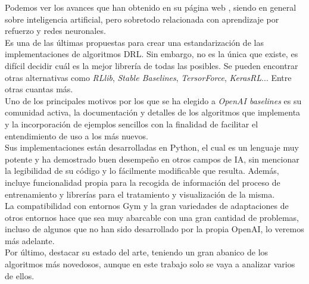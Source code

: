 \documentclass[11pt,fleqn]{book} %
\begin{document}
Podemos ver los avances que han obtenido en su página web \cite{article:openAI2}, siendo en general sobre inteligencia artificial, pero sobretodo relacionada con aprendizaje por refuerzo y redes neuronales.\\

Es una de las últimas propuestas para crear una estandarización de las implementaciones de algoritmos DRL. Sin embargo, no es la única que existe, es difícil decidir cuál es la mejor librería de todas las posibles. Se pueden encontrar otras alternativas como \textit{RLlib}, \textit{Stable Baselines}, \textit{TersorForce}, \textit{KerasRL}... Entre otras cuantas más. \\

Uno de los principales motivos por los que se ha elegido a \textit{OpenAI baselines} es su comunidad activa, la documentación y detalles de los algoritmos que implementa y la incorporación de ejemplos sencillos con la finalidad de facilitar el entendimiento de uso a los más nuevos. \\

Sus implementaciones están desarrolladas en Python, el cual es un lenguaje muy potente y ha demostrado buen desempeño en otros campos de IA, sin mencionar la legibilidad de su código y lo fácilmente modificable que resulta. Además, incluye funcionalidad propia para la recogida de información del proceso de entrenamiento y librerías para el tratamiento y visualización de la misma. \\

La compatibilidad con entornos Gym y la gran variedades de adaptaciones de otros entornos hace que sea muy abarcable con una gran cantidad de problemas, incluso de algunos que no han sido desarrollado por la propia OpenAI, lo veremos más adelante. \\

Por último, destacar su estado del arte, teniendo un gran abanico de los algoritmos más novedosos, aunque en este trabajo solo se vaya a analizar varios de ellos.
\end{document}
